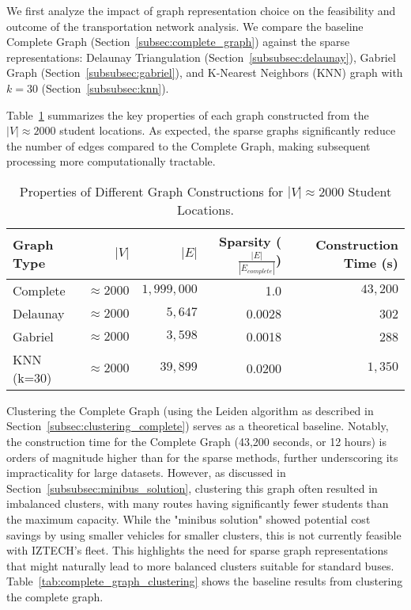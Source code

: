 We first analyze the impact of graph representation choice on the feasibility and outcome of the transportation network analysis. We compare the baseline Complete Graph (Section~\ref{subsec:complete_graph}) against the sparse representations: Delaunay Triangulation (Section~\ref{subsubsec:delaunay}), Gabriel Graph (Section~\ref{subsubsec:gabriel}), and K-Nearest Neighbors (KNN) graph with $k=30$ (Section~\ref{subsubsec:knn}).

Table~\ref{tab:graph_properties} summarizes the key properties of each graph constructed from the $|V| \approx 2000$ student locations. As expected, the sparse graphs significantly reduce the number of edges compared to the Complete Graph, making subsequent processing more computationally tractable.

\begin{table}[h]
    \centering
    \label{tab:graph_properties}
    \begin{tabular}{lrrrr}
    \toprule
    Graph Type & $|V|$ & $|E|$ & Sparsity ($\frac{|E|}{|E_{complete}|}$) & Construction Time (s) \\
    \midrule
    Complete & $\approx 2000$ & $ 1,999,000$ & 1.0 & $ 43,200$ \\
    Delaunay & $\approx 2000$ & $ 5,647$ & 0.0028 & 302 \\
    Gabriel & $\approx 2000$ & $ 3,598$ & 0.0018 & 288 \\
    KNN (k=30) & $\approx 2000$ & $ 39,899$ & 0.0200 & $ 1,350$ \\
    \bottomrule
    \end{tabular}
    \caption{Properties of Different Graph Constructions for $|V| \approx 2000$ Student Locations.}
    \end{table}

Clustering the Complete Graph (using the Leiden algorithm as described in Section~\ref{subsec:clustering_complete}) serves as a theoretical baseline. Notably, the construction time for the Complete Graph (43,200 seconds, or 12 hours) is orders of magnitude higher than for the sparse methods, further underscoring its impracticality for large datasets. However, as discussed in Section~\ref{subsubsec:minibus_solution}, clustering this graph often resulted in imbalanced clusters, with many routes having significantly fewer students than the maximum capacity. While the "minibus solution" showed potential cost savings by using smaller vehicles for smaller clusters, this is not currently feasible with IZTECH's fleet. This highlights the need for sparse graph representations that might naturally lead to more balanced clusters suitable for standard buses. Table~\ref{tab:complete_graph_clustering} shows the baseline results from clustering the complete graph.

